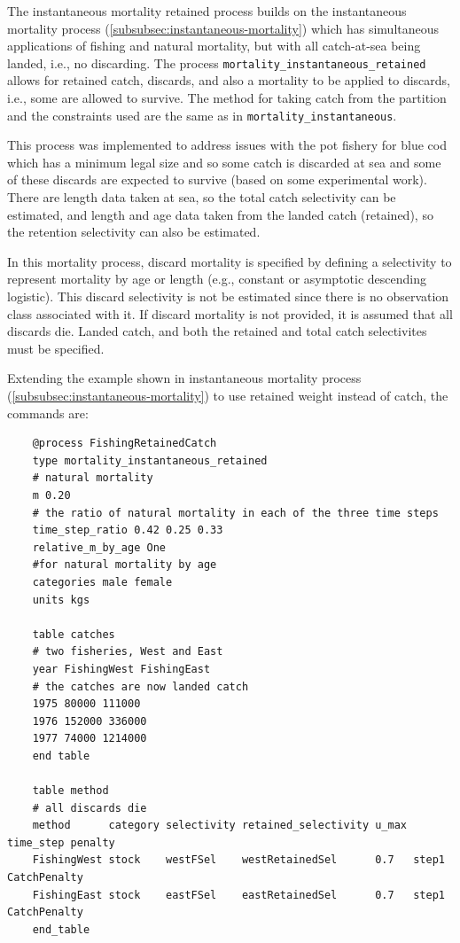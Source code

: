 The instantaneous mortality retained process builds on the instantaneous mortality process (\ref{subsubsec:instantaneous-mortality}) which has simultaneous applications of fishing and natural
mortality, but with all catch-at-sea being landed, i.e., no discarding. The process \texttt{mortality\_instantaneous\_retained} allows for retained catch, discards, and also a mortality to be applied to discards, i.e., some are allowed to survive. The method for taking catch from the partition and the constraints used are the same as in \texttt{mortality\_instantaneous}.

This process was implemented to address issues with the pot fishery for blue cod which has a minimum legal size and so some catch is discarded at sea and some of these discards are expected to survive (based on some experimental work). There are length data taken at sea, so the total catch selectivity can be estimated, and length and age data taken from the landed catch (retained), so the retention selectivity can also be estimated.

In this mortality process, discard mortality is specified by defining a selectivity to represent mortality by age or length (e.g., constant or asymptotic descending logistic).  This discard selectivity is not be estimated since there is no observation class associated with it. If discard mortality is not provided, it is assumed that all discards die. Landed catch, and both the retained and total catch selectivites must be specified.

Extending the example shown in instantaneous mortality process (\ref{subsubsec:instantaneous-mortality}) to use retained weight instead of catch, the commands are:

{\small{\begin{verbatim}
    @process FishingRetainedCatch
    type mortality_instantaneous_retained
    # natural mortality
    m 0.20
    # the ratio of natural mortality in each of the three time steps
    time_step_ratio 0.42 0.25 0.33
    relative_m_by_age One
    #for natural mortality by age
    categories male female
    units kgs

    table catches
    # two fisheries, West and East
    year FishingWest FishingEast
    # the catches are now landed catch
    1975 80000 111000
    1976 152000 336000
    1977 74000 1214000
    end table

    table method
    # all discards die
    method      category selectivity retained_selectivity u_max time_step penalty
    FishingWest stock    westFSel    westRetainedSel      0.7   step1     CatchPenalty
    FishingEast stock    eastFSel    eastRetainedSel      0.7   step1     CatchPenalty
    end_table
\end{verbatim}}}

